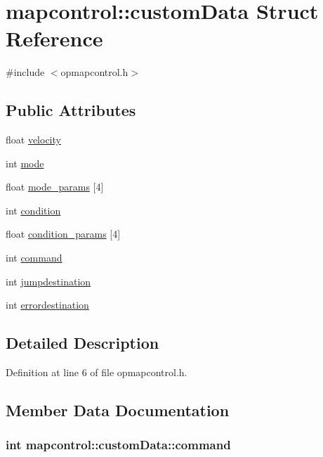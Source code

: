 \hypertarget{structmapcontrol_1_1custom_data}{\section{mapcontrol\-:\-:custom\-Data \-Struct \-Reference}
\label{structmapcontrol_1_1custom_data}
}


{\ttfamily \#include $<$opmapcontrol.\-h$>$}

\subsection*{\-Public \-Attributes}
\begin{DoxyCompactItemize}
\item 
float \hyperlink{structmapcontrol_1_1custom_data_ab084fbb62527f0b71d74c9977c2e3f90}{velocity}
\item 
int \hyperlink{structmapcontrol_1_1custom_data_a9279c0043a43ebef696356bae0099891}{mode}
\item 
float \hyperlink{structmapcontrol_1_1custom_data_ad6156981de3b51dd4942a6c4a53dbc8d}{mode\-\_\-params} \mbox{[}4\mbox{]}
\item 
int \hyperlink{structmapcontrol_1_1custom_data_a4bc59f4c1c8b0d292c6544d656ccd74a}{condition}
\item 
float \hyperlink{structmapcontrol_1_1custom_data_a9b6c6f2c6385e568668e7d821fcb5da7}{condition\-\_\-params} \mbox{[}4\mbox{]}
\item 
int \hyperlink{structmapcontrol_1_1custom_data_a45873bfe2b453babcb46de68a336b514}{command}
\item 
int \hyperlink{structmapcontrol_1_1custom_data_a5e5179235bf8627c28c4c8b4ce0c8b84}{jumpdestination}
\item 
int \hyperlink{structmapcontrol_1_1custom_data_a065cac348b1f88fe39b41fd1d0f6fad4}{errordestination}
\end{DoxyCompactItemize}


\subsection{\-Detailed \-Description}


\-Definition at line 6 of file opmapcontrol.\-h.



\subsection{\-Member \-Data \-Documentation}
\hypertarget{structmapcontrol_1_1custom_data_a45873bfe2b453babcb46de68a336b514}{
\subsubsection[{command}]{\setlength{\rightskip}{0pt plus 5cm}int {\bf mapcontrol\-::custom\-Data\-::command}}}\label{structmapcontrol_1_1custom_data_a45873bfe2b453babcb46de68a336b514}


